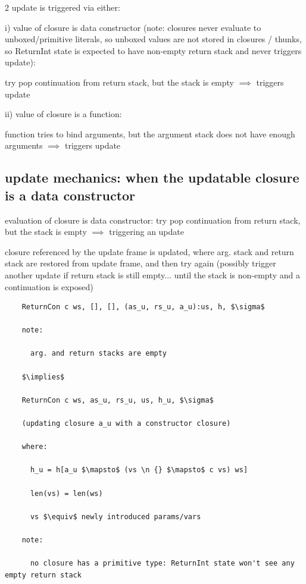 \documentclass[8pt]{extarticle}
\begin{document}
\begin{multicols*}{2}
  update is triggered via either:

  i) value of closure is data constructor (note: closures never evaluate to unboxed/primitive literals, so unboxed values are not stored in closures / thunks, so ReturnInt state is expected to have non-empty return stack and never triggers update):

  try pop continuation from return stack, but the stack is empty $\implies$ triggers update

  ii) value of closure is a function:

  function tries to bind arguments, but the argument stack does not have enough arguments $\implies$ triggers update

  \vfill\null
  \columnbreak

  \subsection{update mechanics: when the updatable closure is a data constructor}
  evaluation of closure is data constructor: try pop continuation from return stack, but the stack is empty $\implies$ triggering an update

  closure referenced by the update frame is updated, where arg. stack and return stack are restored from update frame, and then try again (possibly trigger another update if return stack is still empty... until the stack is non-empty and a continuation is exposed)

  \begin{lstlisting}
    ReturnCon c ws, [], [], (as_u, rs_u, a_u):us, h, $\sigma$

    note:

      arg. and return stacks are empty

    $\implies$

    ReturnCon c ws, as_u, rs_u, us, h_u, $\sigma$

    (updating closure a_u with a constructor closure)

    where:

      h_u = h[a_u $\mapsto$ (vs \n {} $\mapsto$ c vs) ws]

      len(vs) = len(ws)

      vs $\equiv$ newly introduced params/vars

    note:

      no closure has a primitive type: ReturnInt state won't see any empty return stack
  \end{lstlisting}


\end{multicols*}
\end{document}
